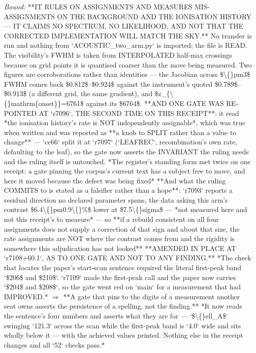 \begin{description}
 \emph{Bound:}  **IT RULES ON ASSIGNMENTS AND MEASURES MIS-ASSIGNMENTS ON THE BACKGROUND AND THE IONISATION HISTORY --- IT CLAIMS NO SPECTRUM, NO LIKELIHOOD, AND NOT THAT THE CORRECTED IMPLEMENTATION WILL MATCH THE SKY.** No transfer is run and nothing from `ACOUSTIC\_two\_arm.py` is imported; the file is READ.  The visibility's FWHM is taken from INTERPOLATED half-max crossings because on grid points it is quantised coarser than the move being measured.  Two figures are corroborations rather than identities --- the Jacobian across \$\textbackslash\{\}pm3\$ FWHM comes back \$0.812\$--\$0.924\$ against the instrument's quoted \$0.789\$--\$0.913\$ (a different grid, the same gradient), and \$z\_\{\textbackslash\{\}mathrm\{onset\}\}=6761\$ against its \$6764\$.  **AND ONE GATE WAS RE-POINTED AT `r7096`, THE SECOND TIME ON THIS RECEIPT**: it read *the ionisation history's rate is NOT independently assignable*, which was true when written and was reported as **a knob to SPLIT rather than a value to change** --- `cc66` split it at `r7097` (`LEAFREC`, recombination's own rate, defaulting to the leaf), so the gate now asserts the INVARIANT the ruling needs and the ruling itself is untouched.  *The register's standing form met twice on one receipt: a gate pinning the corpus's current text has a subject free to move, and here it moved because the defect was being fixed*  **And what the ruling COMMITS to is stated as a falsifier rather than a hope**: `r7093` reports a residual direction no declared parameter spans, the data asking this arm's contrast \$6.4\textbackslash\{\}pm0.9\textbackslash\{\}\%\$ lower at \$7.5\textbackslash\{\}sigma\$ --- *not measured here and not this receipt's to measure* --- so **if a rebuild consistent on all four assignments does not supply a correction of that sign and about that size, the rate assignments are NOT where the contrast comes from and the rigidity is somewhere this adjudication has not looked**  **AMENDED IN PLACE AT `r7108+60.1`, AS TO ONE GATE AND NOT TO ANY FINDING.** *The check that locates the paper's start-scan sentence required the literal first-peak band `\$206\$ and \$210\$`. `r7109` made the first-peak call and the paper now carries `\$204\$ and \$208\$`, so the gate went red on `main` for a measurement that had IMPROVED.* \ensuremath{\Rightarrow} **A gate that pins to the digits of a measurement another seat owns asserts the persistence of a spelling, not the finding.** *It now reads the sentence's four numbers and asserts what they are for --- `\$\textbackslash\{\}ell\_A\$` swinging `121.3` across the scan while the first-peak band is `4.0` wide and sits wholly below it --- with the achieved values printed. Nothing else in the receipt changes and all `52` checks pass.*

\end{description}
